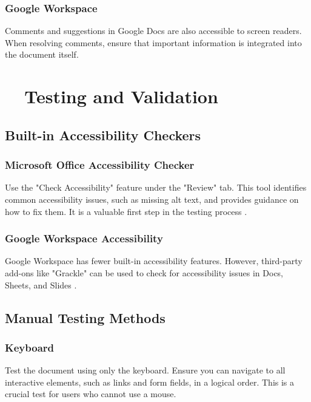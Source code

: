 \subsubsection{Google Workspace}\label{ch15:sssec:google-comments}
Comments and suggestions in Google Docs are also accessible to screen readers. When resolving comments, ensure that important information is integrated into the document itself.

\section{~~Testing and Validation}\label{ch15:sec:testing-validation}

\subsection{Built-in Accessibility Checkers}\label{ch15:ssec:a11y-checkers}

\subsubsection{Microsoft Office Accessibility Checker}\label{ch15:sssec:office-a11y-checker}
Use the "Check Accessibility" feature under the "Review" tab. This tool identifies common accessibility issues, such as missing alt text, and provides guidance on how to fix them. It is a valuable first step in the testing process \supercite{MicrosoftAccessibility}.

\subsubsection{Google Workspace Accessibility}\label{ch15:sssec:google-a11y-checker}
Google Workspace has fewer built-in accessibility features. However, third-party add-ons like "Grackle" can be used to check for accessibility issues in Docs, Sheets, and Slides \supercite{GrackleDocs}.

\subsection{Manual Testing Methods}\label{ch15:ssec:manual-testing}

\subsubsection{Keyboard }\label{ch15:sssec:keyboard-nav}
Test the document using only the keyboard. Ensure you can navigate to all interactive elements, such as links and form fields, in a logical order. This is a crucial test for users who cannot use a mouse.

